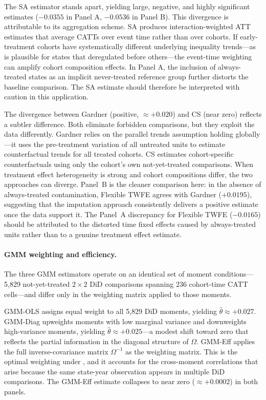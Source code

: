 The SA estimator stands apart, yielding large, negative, and highly
significant estimates ($-0.0355$ in Panel A, $-0.0536$ in Panel B). This
divergence is attributable to its aggregation scheme. SA produces
interaction-weighted ATT estimates that average CATTs over event time
rather than over cohorts. If early-treatment cohorts have systematically
different underlying inequality trends---as is plausible for states that
deregulated before others---the event-time weighting can amplify cohort
composition effects. In Panel A, the inclusion of always-treated states
as an implicit never-treated reference group further distorts the baseline
comparison. The SA estimate should therefore be interpreted with caution
in this application.

The divergence between Gardner (positive, $\approx+0.020$) and CS
(near zero) reflects a subtler difference. Both eliminate forbidden
comparisons, but they exploit the data differently. Gardner relies on
the parallel trends assumption holding globally---it uses the
pre-treatment variation of all untreated units to estimate
counterfactual trends for all treated cohorts. CS estimates
cohort-specific counterfactuals using only the cohort's own
not-yet-treated comparisons. When treatment effect heterogeneity is
strong and cohort compositions differ, the two approaches can diverge.
Panel~B is the cleaner comparison here: in the absence of always-treated
contamination, Flexible TWFE agrees with Gardner ($+0.0195$), suggesting
that the imputation approach consistently delivers a positive estimate
once the data support it. The Panel~A discrepancy for Flexible TWFE
($-0.0165$) should be attributed to the distorted time fixed effects
caused by always-treated units rather than to a genuine treatment
effect estimate.

\paragraph{GMM weighting and efficiency.}
The three GMM estimators operate on an identical set of moment
conditions---5{,}829 not-yet-treated $2\times 2$ DiD comparisons spanning
236 cohort-time CATT cells---and differ only in the weighting matrix
applied to those moments.

GMM-OLS assigns equal weight to all 5{,}829 DiD moments, yielding
$\hat{\theta} \approx +0.027$. GMM-Diag upweights moments with low
marginal variance and downweights high-variance moments, yielding
$\hat{\theta} \approx +0.025$---a modest shift toward zero that reflects
the partial information in the diagonal structure of $\Omega$.
GMM-Eff applies the full inverse-covariance matrix $\Omega^{-1}$ as the
weighting matrix. This is the optimal weighting under
\citet{hansen1982}, and it accounts for the cross-moment correlations that
arise because the same state-year observation appears in multiple DiD
comparisons. The GMM-Eff estimate collapses to near zero
($\approx+0.0002$) in both panels.

